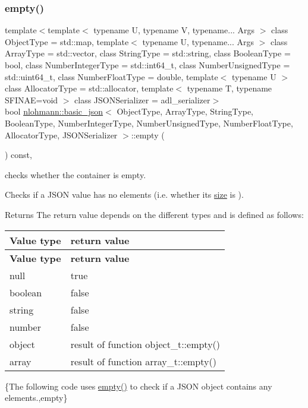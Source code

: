 \subsubsection{\texorpdfstring{empty()}{empty()}}
{\footnotesize\ttfamily template$<$template$<$ typename U, typename V, typename... Args $>$ class Object\+Type = std\+::map, template$<$ typename U, typename... Args $>$ class Array\+Type = std\+::vector, class String\+Type  = std\+::string, class Boolean\+Type  = bool, class Number\+Integer\+Type  = std\+::int64\+\_\+t, class Number\+Unsigned\+Type  = std\+::uint64\+\_\+t, class Number\+Float\+Type  = double, template$<$ typename U $>$ class Allocator\+Type = std\+::allocator, template$<$ typename T, typename S\+F\+I\+N\+A\+E=void $>$ class J\+S\+O\+N\+Serializer = adl\+\_\+serializer$>$ \\
bool \mbox{\hyperlink{classnlohmann_1_1basic__json}{nlohmann\+::basic\+\_\+json}}$<$ Object\+Type, Array\+Type, String\+Type, Boolean\+Type, Number\+Integer\+Type, Number\+Unsigned\+Type, Number\+Float\+Type, Allocator\+Type, J\+S\+O\+N\+Serializer $>$\+::empty (\begin{DoxyParamCaption}{ }\end{DoxyParamCaption}) const\hspace{0.3cm}{\ttfamily [inline]}, {\ttfamily [noexcept]}}



checks whether the container is empty. 

Checks if a J\+S\+ON value has no elements (i.\+e. whether its \mbox{\hyperlink{classnlohmann_1_1basic__json_a25e27ad0c6d53c01871c5485e1f75b96}{size}} is {}).

\begin{DoxyReturn}{Returns}
The return value depends on the different types and is defined as follows\+: \tabulinesep=1mm
\begin{longtabu} spread 0pt [c]{*{2}{|X[-1]}|}
\hline
\rowcolor{\tableheadbgcolor}\textbf{ Value type  }&\textbf{ return value   }\\
\endfirsthead
\hline
\endfoot
\hline
\rowcolor{\tableheadbgcolor}\textbf{ Value type  }&\textbf{ return value   }\\
\endhead
null  &{\ttfamily true}   \\
boolean  &{\ttfamily false}   \\
string  &{\ttfamily false}   \\
number  &{\ttfamily false}   \\
object  &result of function {\ttfamily object\+\_\+t\+::empty()}   \\
array  &result of function {\ttfamily array\+\_\+t\+::empty()}   \\
\end{longtabu}

\end{DoxyReturn}
\{The following code uses {\ttfamily \mbox{\hyperlink{classnlohmann_1_1basic__json_a1a86d444bfeaa9518d2421aedd74444a}{empty()}}} to check if a J\+S\+ON object contains any elements.,empty\}

